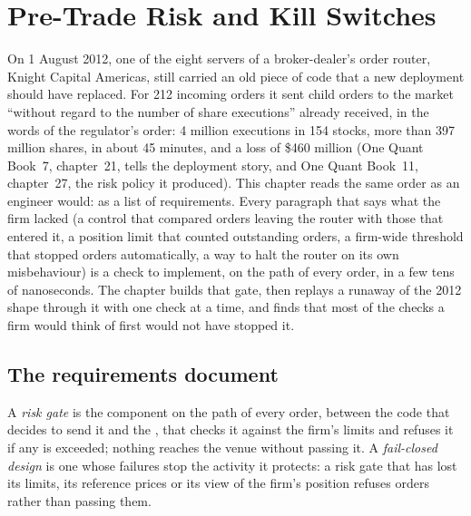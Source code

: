 \chapter{Pre-Trade Risk and Kill Switches}\label{ch:ll:pre-trade-risk-and-kill-switches}

On 1 August 2012, one of the eight servers of a broker-dealer's order router, Knight Capital Americas, still carried an old
piece of code that a new deployment should have replaced. For 212 incoming orders it sent child orders to the market ``without
regard to the number of share executions'' already received, in the words of the regulator's order: 4 million executions in 154
stocks, more than 397 million shares, in about 45 minutes, and a loss of \$460 million (One Quant Book~7, chapter~21, tells the
deployment story, and One Quant Book~11, chapter~27, the risk policy it produced). This chapter reads the same order as an
engineer would: as a list of requirements. Every paragraph that says what the firm lacked (a control that compared orders
leaving the router with those that entered it, a position limit that counted outstanding orders, a firm-wide threshold that
stopped orders automatically, a way to halt the router on its own misbehaviour) is a check to implement, on the path of every
order, in a few tens of nanoseconds. The chapter builds that gate, then replays a runaway of the 2012 shape through it with
one check at a time, and finds that most of the checks a firm would think of first would not have stopped it.

\section{The requirements document}

\begin{definition}\label{def:ll:pre-trade-risk-and-kill-switches:gate}
A \emph{risk gate} is the component on the path of every order, between the code that decides to send it and
the , that checks it against the firm's limits and refuses it if any is exceeded; nothing reaches the venue
without passing it. A \emph{fail-closed design} is one whose failures stop the activity it protects:
a risk gate that has lost its limits, its reference prices or its view of the firm's position refuses orders rather than
passing them.
\end{definition}

